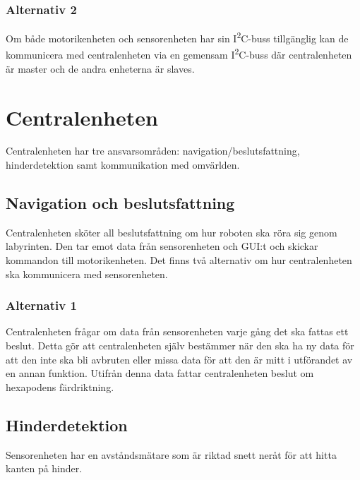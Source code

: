 \documentclass[a4paper,titlepage,12pt]{article}
\newcommand{\itc}{I\textsuperscript{2}C}
\begin{document}
	\subsubsection{Alternativ 2}
	Om både motorikenheten och sensorenheten har sin \itc{}-buss tillgänglig kan de kommunicera med centralenheten via en gemensam \itc{}-buss där centralenheten är master och de andra enheterna är slaves. 
	
	\section{Centralenheten}
	Centralenheten har tre ansvarsområden: navigation/beslutsfattning, hinderdetektion samt
	kommunikation med omvärlden.

	\subsection{Navigation och beslutsfattning}

	Centralenheten sköter all beslutsfattning om hur roboten ska röra sig
	genom labyrinten. Den tar emot data från sensorenheten och GUI:t och
	skickar kommandon till motorikenheten. Det finns två alternativ om hur
	centralenheten ska kommunicera med sensorenheten.
  
  \subsubsection{Alternativ 1}
  Centralenheten frågar om data från sensorenheten varje gång det ska fattas ett
  beslut. Detta gör att centralenheten själv bestämmer när den ska ha ny data
  för att den inte ska bli avbruten eller missa data för att den är mitt i
  utförandet av en annan funktion. Utifrån denna data fattar centralenheten
  beslut om hexapodens färdriktning.
  
	\subsection{Hinderdetektion}
	Sensorenheten har en avståndsmätare som är riktad snett neråt för att hitta kanten på hinder.
\end{document}
